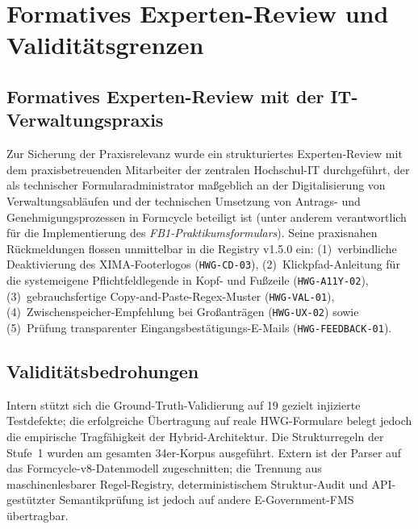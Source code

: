 \section{Formatives Experten-Review und Validitätsgrenzen}
\label{sec:praxistauglichkeit_validitaet}

\subsection{Formatives Experten-Review mit der IT-Verwaltungspraxis}
\label{subsec:experten_review}

Zur Sicherung der Praxisrelevanz wurde ein strukturiertes Experten-Review mit dem praxisbetreuenden Mitarbeiter der zentralen Hochschul-IT durchgeführt, der als technischer Formularadministrator maßgeblich an der Digitalisierung von Verwaltungsabläufen und der technischen Umsetzung von Antrags- und Genehmigungsprozessen in Formcycle beteiligt ist (unter anderem verantwortlich für die Implementierung des \textit{FB1-Praktikumsformulars}). Seine praxisnahen Rückmeldungen flossen unmittelbar in die Registry v1.5.0 ein: (1)~verbindliche Deaktivierung des XIMA-Footerlogos (\texttt{HWG-CD-03}), (2)~Klickpfad-Anleitung für die systemeigene Pflichtfeldlegende in Kopf- und Fußzeile (\texttt{HWG-A11Y-02}), (3)~gebrauchsfertige Copy-and-Paste-Regex-Muster (\texttt{HWG-VAL-01}), (4)~Zwischenspeicher-Empfehlung bei Großanträgen (\texttt{HWG-UX-02}) sowie (5)~Prüfung transparenter Eingangsbestätigungs-E-Mails (\texttt{HWG-FEEDBACK-01}).

\subsection{Validitätsbedrohungen}
\label{subsec:validitaetsbedrohungen}

Intern stützt sich die Ground-Truth-Validierung auf 19 gezielt injizierte Testdefekte; die erfolgreiche Übertragung auf reale HWG-Formulare belegt jedoch die empirische Tragfähigkeit der Hybrid-Architektur. Die Strukturregeln der Stufe~1 wurden am gesamten 34er-Korpus ausgeführt. Extern ist der Parser auf das Formcycle-v8-Datenmodell zugeschnitten; die Trennung aus maschinenlesbarer Regel-Registry, deterministischem Struktur-Audit und API-gestützter Semantikprüfung ist jedoch auf andere E-Government-FMS übertragbar.

